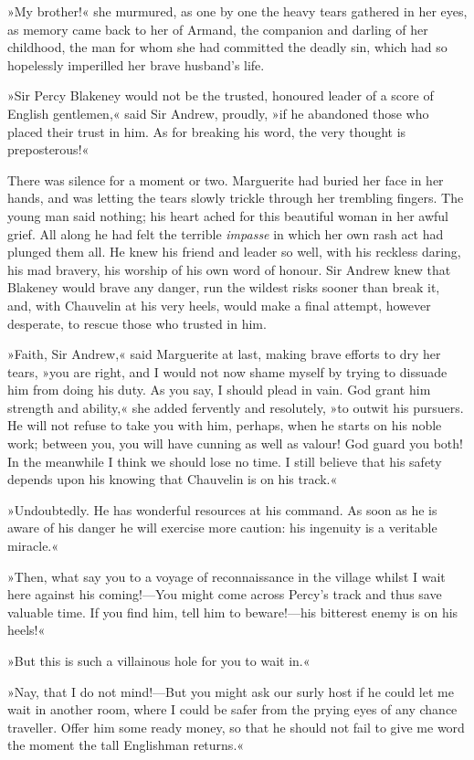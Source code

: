 »My brother!« she murmured, as one by one the heavy tears gathered in her eyes, as memory came back to her of Armand, the companion and darling of her childhood, the man for whom she had committed the deadly sin, which had so hopelessly imperilled her brave husband's life.

»Sir Percy Blakeney would not be the trusted, honoured leader of a score of English gentlemen,« said Sir Andrew, proudly, »if he abandoned those who placed their trust in him. As for breaking his word, the very thought is preposterous!«

There was silence for a moment or two. Marguerite had buried her face in her hands, and was letting the tears slowly trickle through her trembling fingers. The young man said nothing; his heart ached for this beautiful woman in her awful grief. All along he had felt the terrible \textit{impasse} in which her own rash act had plunged them all. He knew his friend and leader so well, with his reckless daring, his mad bravery, his worship of his own word of honour. Sir Andrew knew that Blakeney would brave any danger, run the wildest risks sooner than break it, and, with Chauvelin at his very heels, would make a final attempt, however desperate, to rescue those who trusted in him.

»Faith, Sir Andrew,« said Marguerite at last, making brave efforts to dry her tears, »you are right, and I would not now shame myself by trying to dissuade him from doing his duty. As you say, I should plead in vain. God grant him strength and ability,« she added fervently and resolutely, »to outwit his pursuers. He will not refuse to take you with him, perhaps, when he starts on his noble work; between you, you will have cunning as well as valour! God guard you both! In the meanwhile I think we should lose no time. I still believe that his safety depends upon his knowing that Chauvelin is on his track.«

»Undoubtedly. He has wonderful resources at his command. As soon as he is aware of his danger he will exercise more caution: his ingenuity is a veritable miracle.«

»Then, what say you to a voyage of reconnaissance in the village whilst I wait here against his coming!—You might come across Percy's track and thus save valuable time. If you find him, tell him to beware!—his bitterest enemy is on his heels!«

»But this is such a villainous hole for you to wait in.«

»Nay, that I do not mind!—But you might ask our surly host if he could let me wait in another room, where I could be safer from the prying eyes of any chance traveller. Offer him some ready money, so that he should not fail to give me word the moment the tall Englishman returns.«


